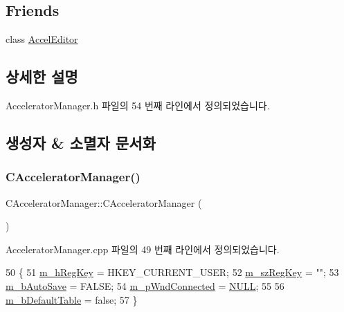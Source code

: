 \subsection*{Friends}
\begin{DoxyCompactItemize}
\item 
class \mbox{\hyperlink{class_c_accelerator_manager_ad13d9a415d0447ece033ae132991aefc}{Accel\+Editor}}
\end{DoxyCompactItemize}


\subsection{상세한 설명}


Accelerator\+Manager.\+h 파일의 54 번째 라인에서 정의되었습니다.



\subsection{생성자 \& 소멸자 문서화}
\mbox{\label{class_c_accelerator_manager_a83fbbf342f3ee19cac3366e912edce3e}} 
\subsubsection{\texorpdfstring{C\+Accelerator\+Manager()}{CAcceleratorManager()}}
{\footnotesize\ttfamily C\+Accelerator\+Manager\+::\+C\+Accelerator\+Manager (\begin{DoxyParamCaption}{ }\end{DoxyParamCaption})}



Accelerator\+Manager.\+cpp 파일의 49 번째 라인에서 정의되었습니다.


\begin{DoxyCode}
50 \{
51   \mbox{\hyperlink{class_c_accelerator_manager_a2652d64c947f7f3474b3aa054861b34b}{m\_hRegKey}} = HKEY\_CURRENT\_USER;
52   \mbox{\hyperlink{class_c_accelerator_manager_a03a6d0e43bcfb63cf1a23ad12cb5aa35}{m\_szRegKey}} = \textcolor{stringliteral}{""};
53   \mbox{\hyperlink{class_c_accelerator_manager_a37b504c74c13ca2d62eea8abffe73102}{m\_bAutoSave}} = FALSE;
54   \mbox{\hyperlink{class_c_accelerator_manager_a24f706c75f754982051e1d7fad1916da}{m\_pWndConnected}} = \mbox{\hyperlink{getopt1_8c_a070d2ce7b6bb7e5c05602aa8c308d0c4}{NULL}};
55 
56   \mbox{\hyperlink{class_c_accelerator_manager_ac563baf2a7cedb91bc44e9b8581a6020}{m\_bDefaultTable}} = \textcolor{keyword}{false};
57 \}
\end{DoxyCode}
\mbox{\label{class_c_accelerator_manager_ab46a50eed0acc653852961ac02f4ecb4}} 
